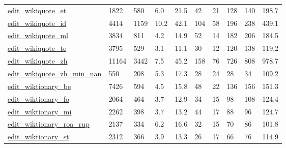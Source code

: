 \begin{longtable}{llllllllll}
 \href{http://konect.cc/networks/edit-enwikiquote}{edit\_wikiquote\_et}                                                       & 1822       & 580   & 6.0    & 21.5   & 42    & 21     & 128    & 140    & 198.7   \\
 \href{http://konect.cc/networks/edit-enwikiquote}{edit\_wikiquote\_id}                                                       & 4414       & 1159  & 10.2   & 42.1   & 104   & 58     & 196    & 238    & 439.1   \\
 \href{http://konect.cc/networks/edit-enwikiquote}{edit\_wikiquote\_ml}                                                       & 3834       & 811   & 4.2    & 14.9   & 52    & 14     & 182    & 206    & 184.5   \\
 \href{http://konect.cc/networks/edit-enwikiquote}{edit\_wikiquote\_te}                                                       & 3795       & 529   & 3.1    & 11.1   & 30    & 12     & 120    & 138    & 119.2   \\
 \href{http://konect.cc/networks/edit-enwikiquote}{edit\_wikiquote\_zh}                                                       & 11164      & 3442  & 7.5    & 45.2   & 158   & 76     & 726    & 808    & 978.7   \\
 \href{http://konect.cc/networks/edit-enwikiquote}{edit\_wikiquote\_zh\_min\_nan}                                               & 550        & 208   & 5.3    & 17.3   & 28    & 24     & 28     & 34     & 109.2   \\
 \href{http://konect.cc/networks/edit-frwiktionary}{edit\_wiktionary\_be}                                                     & 7426       & 594   & 4.5    & 15.8   & 48    & 22     & 136    & 156    & 151.3   \\
 \href{http://konect.cc/networks/edit-frwiktionary}{edit\_wiktionary\_fo}                                                     & 2064       & 464   & 3.7    & 12.9   & 34    & 15     & 98     & 108    & 124.4   \\
 \href{http://konect.cc/networks/edit-frwiktionary}{edit\_wiktionary\_mi}                                                     & 2262       & 398   & 3.7    & 13.2   & 44    & 17     & 88     & 96     & 124.7   \\
 \href{http://konect.cc/networks/edit-frwiktionary}{edit\_wiktionary\_roa\_rup}                                                & 2137       & 334   & 6.2    & 16.6   & 32    & 15     & 70     & 86     & 101.8   \\
 \href{http://konect.cc/networks/edit-frwiktionary}{edit\_wiktionary\_st}                                                     & 2312       & 366   & 3.9    & 13.3   & 26    & 17     & 66     & 76     & 114.9   \\

\end{longtable}
